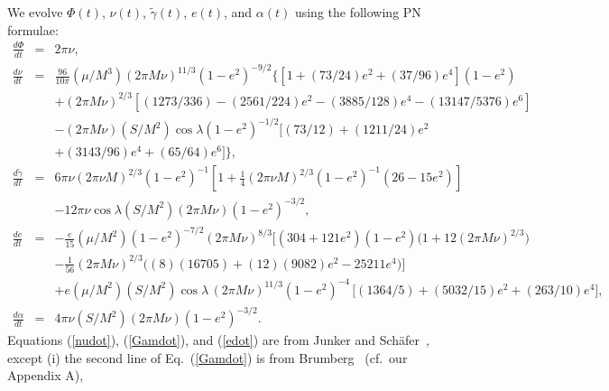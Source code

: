 \documentclass[11pt]{report}
\begin{document}
We evolve $\Phi(t)$, $\nu(t)$, $\tilde\gamma(t)$, $e(t)$,
and $\alpha(t)$ using the following PN formulae:
\begin{eqnarray}
\frac{d\Phi}{dt} &=& 2\pi\nu, \label{Phidot} \\
%
\frac{d\nu}{dt} &=&
\frac{96}{10\pi}(\mu/M^3)(2\pi M\nu)^{11/3}(1-e^2)^{-9/2}
\bigl\{
\left[1+(73/24)e^2+(37/96)e^4\right](1-e^2) \nonumber \\
&&+ (2\pi M\nu)^{2/3}\left[(1273/336)-(2561/224)e^2-(3885/128)e^4
-(13147/5376)e^6 \right] \nonumber \\
&&- (2\pi M\nu)(S/M^2)\cos\lambda (1-e^2)^{-1/2}\bigl[(73/12)
+ (1211/24)e^2 \nonumber \\
&&+(3143/96)e^4 +(65/64)e^6 \bigr]
\bigr\}, \label{nudot} \\
%
\frac{d\tilde\gamma}{dt} &=& 6\pi\nu(2\pi\nu M)^{2/3} (1-e^2)^{-1}
\left[1+\frac{1}{4}(2\pi\nu M)^{2/3} (1-e^2)^{-1}(26-15e^2)\right] \nonumber \\
&&-12\pi\nu\cos\lambda (S/M^2) (2\pi M\nu)(1-e^2)^{-3/2},
\label{Gamdot} \\
%
\frac{de}{dt}  &=& -\frac{e}{15}(\mu/M^2) (1-e^2)^{-7/2} (2\pi M\nu)^{8/3}
\bigl[(304+121e^2)(1-e^2)\bigl(1 + 12 (2\pi M\nu)^{2/3}\bigr) \, \nonumber \\
&&- \frac{1}{56}(2\pi M\nu)^{2/3}\bigl( (8)(16705) + (12)(9082)e^2 - 25211e^4 \bigr)\bigr]\,
\nonumber \\
&&+ e (\mu/M^2)(S/M^2)\cos\lambda\,(2\pi M\nu)^{11/3}(1-e^2)^{-4}
\, \bigl[(1364/5) + (5032/15)e^2 + (263/10)e^4\bigr] ,
\label{edot} \\
%
\frac{d\alpha}{dt} &=& 4\pi\nu (S/M^2) (2\pi M\nu)(1-e^2)^{-3/2}.
\label{alphadot}
\end{eqnarray}
Equations (\ref{nudot}), (\ref{Gamdot}), and (\ref{edot}) are from
Junker and Sch\"afer~\cite{JunkerSchaefer}, except (i) the second line
of Eq.\ (\ref{Gamdot}) is from Brumberg~\cite{Brumberg}
(cf.\ our Appendix A),
\end{document}

